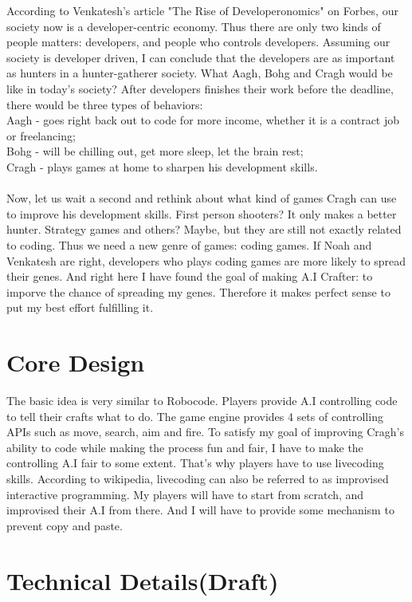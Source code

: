 \documentclass[12pt]{article}
\begin{document}
According to Venkatesh's article "The Rise of Developeronomics"\cite{venkatesh2011} on Forbes, our society now is a developer-centric economy. Thus there are only two kinds of people matters: developers, and people who controls developers. Assuming our society is developer driven, I can conclude that the developers are as important as hunters in a hunter-gatherer society. What Aagh, Bohg and Cragh would be like in today's society? After developers finishes their work before the deadline, there would be three types of behaviors:\\
Aagh - goes right back out to code for more income, whether it is a contract job or freelancing;\\
Bohg - will be chilling out, get more sleep, let the brain rest;\\
Cragh - plays games at home to sharpen his development skills.\\ 
\\
Now, let us wait a second and rethink about what kind of games Cragh can use to improve his development skills. First person shooters? It only makes a better hunter. Strategy games and others? Maybe, but they are still not exactly related to coding. Thus we need a new genre of games: coding games. If Noah and Venkatesh are right, developers who plays coding games are more likely to spread their genes. And right here I have found the goal of making A.I Crafter: to imporve the chance of spreading my genes. Therefore it makes perfect sense to put my best effort fulfilling it.

\section{Core Design}
The basic idea is very similar to Robocode. Players provide A.I controlling code to tell their crafts what to do. The game engine provides 4 sets of controlling APIs such as move, search, aim and fire.
To satisfy my goal of improving Cragh's ability to code while making the process fun and fair, I have to make the controlling A.I fair to some extent.
That's why players have to use livecoding skills. According to wikipedia, livecoding can also be referred to as improvised interactive programming. My players will have to start from scratch, and improvised their A.I from there. And I will have to provide some mechanism to prevent copy and paste.

\section{Technical Details(Draft)}
\end{document}
